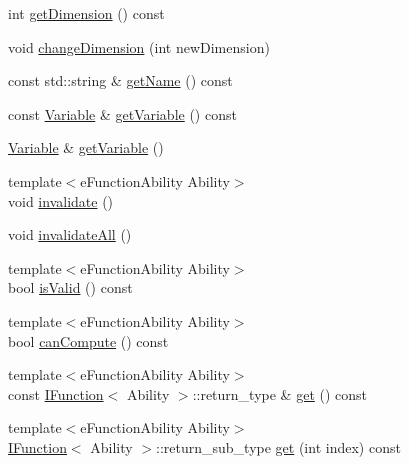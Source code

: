 \begin{DoxyCompactItemize}
\item 
int \hyperlink{structocra_1_1FunctionInterfaceMapping_3_01X_3_01Function_01_4_01_4_a6a30f1828ccfede647a422dde2c90a20}{get\+Dimension} () const 
\item 
void \hyperlink{structocra_1_1FunctionInterfaceMapping_3_01X_3_01Function_01_4_01_4_aebf253ed862abb394f5586709002252e}{change\+Dimension} (int new\+Dimension)
\item 
const std\+::string \& \hyperlink{structocra_1_1FunctionInterfaceMapping_3_01X_3_01Function_01_4_01_4_a1f5692441efec103f3661b4d71abbf1f}{get\+Name} () const 
\item 
const \hyperlink{classocra_1_1Variable}{Variable} \& \hyperlink{structocra_1_1FunctionInterfaceMapping_3_01X_3_01Function_01_4_01_4_a9e15aa9f857d4d483822e7b352fd9b16}{get\+Variable} () const 
\item 
\hyperlink{classocra_1_1Variable}{Variable} \& \hyperlink{structocra_1_1FunctionInterfaceMapping_3_01X_3_01Function_01_4_01_4_a799447e899dab515b46d322223e8b2cf}{get\+Variable} ()
\item 
{\footnotesize template$<$e\+Function\+Ability Ability$>$ }\\void \hyperlink{structocra_1_1FunctionInterfaceMapping_3_01X_3_01Function_01_4_01_4_ac4e31f7faf096831c52691ef361054b1}{invalidate} ()
\item 
void \hyperlink{structocra_1_1FunctionInterfaceMapping_3_01X_3_01Function_01_4_01_4_a1c8b1fac294850b4b70641761acc2542}{invalidate\+All} ()
\item 
{\footnotesize template$<$e\+Function\+Ability Ability$>$ }\\bool \hyperlink{structocra_1_1FunctionInterfaceMapping_3_01X_3_01Function_01_4_01_4_a8447c3f7a6ed58d091ce270feee6c6e1}{is\+Valid} () const 
\item 
{\footnotesize template$<$e\+Function\+Ability Ability$>$ }\\bool \hyperlink{structocra_1_1FunctionInterfaceMapping_3_01X_3_01Function_01_4_01_4_a95a404dbdd4546a08406dc6545534631}{can\+Compute} () const 
\item 
{\footnotesize template$<$e\+Function\+Ability Ability$>$ }\\const \hyperlink{classocra_1_1IFunction}{I\+Function}$<$ Ability $>$\+::return\+\_\+type \& \hyperlink{structocra_1_1FunctionInterfaceMapping_3_01X_3_01Function_01_4_01_4_a34c7b1538a7f03d97a55969c4a07fc8b}{get} () const 
\item 
{\footnotesize template$<$e\+Function\+Ability Ability$>$ }\\\hyperlink{classocra_1_1IFunction}{I\+Function}$<$ Ability $>$\+::return\+\_\+sub\+\_\+type \hyperlink{structocra_1_1FunctionInterfaceMapping_3_01X_3_01Function_01_4_01_4_ae1d2c3a4a53e3e5a0ccd0fa181387060}{get} (int index) const 

\end{DoxyCompactItemize}
